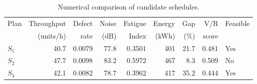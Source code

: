 \begin{table}[htbp]
\centering
\caption{Numerical comparison of candidate schedules.}
\label{tab:numerical-sim}
\small
\begin{tabular}{@{}lrrrrrrrl@{}}
\toprule
Plan & Throughput & Defect & Noise & Fatigue & Energy & Gap & V/R & Feasible \\
     & (units/h)  & rate   & (dB)  & Index   & (kWh)  & (\%) & score &         \\
\midrule
$S_{1}$ & 40.7 & 0.0079 & 77.8 & 0.3501 & 401 & 21.7 & 0.481 & Yes \\
$S_{2}$ & 47.7 & 0.0098 & 83.2 & 0.5972 & 467 & 8.3 & 0.509 & No \\
$S_{3}$ & 42.1 & 0.0082 & 78.7 & 0.3962 & 417 & 35.2 & 0.444 & Yes \\
\bottomrule
\end{tabular}
\end{table}
